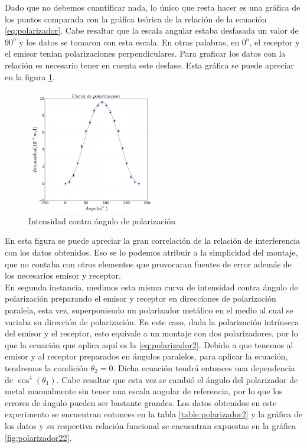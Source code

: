 \documentclass[prb,aps,twocolumn,preprintnumbers,amsmath,amssymb]{revtex4}
\begin{document}
Dado que no debemos cuantificar nada, lo único que resta hacer es una gráfica de los puntos comparada con la gráfica teórica de la relación de la ecuación \ref{eq:polarizador}. Cabe resaltar que la escala angular estaba desfasada un valor de $90^o$ y los datos se tomaron con esta escala. En otras palabras, en $0^o$, el receptor y el emisor tenían polarizaciones perpendiculares. Para graficar los datos con la relación es necesario tener en cuenta este desfase. Esta gráfica se puede apreciar en la figura \ref{fig:polarizer11}. \\


\begin{figure}[h!]
	\centering
	\includegraphics[width=0.5\textwidth]{polarizer11}
	\caption{Intensidad contra ángulo de polarización}
	\label{fig:polarizer11}
\end{figure}

En esta figura se puede apreciar la gran correlación de la relación de interferencia con los datos obtenidos. Eso se lo podemos atribuir a la simplicidad del montaje, que no contaba con otros elementos que provocaran fuentes de error además de los necesarios emisor y receptor.\\

En segunda instancia, medimos esta misma curva de intensidad contra ángulo de polarización preparando el emisor y receptor en direcciones de polarización paralela, esta vez, superponiendo un polarizador metálico en el medio al cual se variaba su dirección de polarización. En este caso, dada la polarización intrínseca del emisor y el receptor, esto equivale a un montaje con dos polarizadores, por lo que la ecuación que aplica aquí es la \ref{eq:polarizador2}. Debido a que tenemos al emisor y al receptor preparados en ángulos paralelos, para aplicar la ecuación, tendremos la condición $\theta_2 = 0$. Dicha ecuación tendrá entonces una dependencia de $\cos^4{(\theta_1)}$. Cabe resaltar que esta vez se cambió el ángulo del polarizador de metal manualmente sin tener una escala angular de referencia, por lo que los errores de ángulo pueden ser bastante grandes. Los datos obtenidos en este experimento se encuentran entonces en la tabla \ref{table:polarizador2} y la gráfica de los datos y su respectiva relación funcional se encuentran expuestas en la gráfica \ref{fig:polarizador22}. \\
\end{document}
